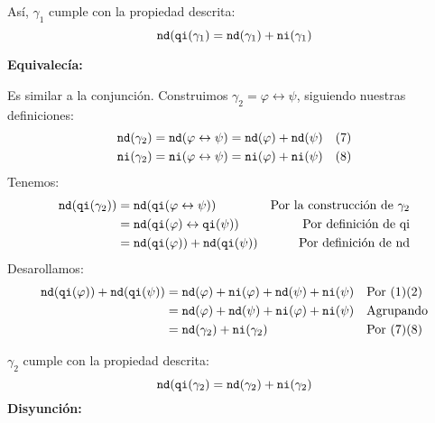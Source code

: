 \documentclass[8pt, letterpaper]{article}
\begin{document}
\begin{enumerate}
   Así, $\gamma_1$ cumple con la propiedad descrita:
   $${\tt nd}({\tt qi}(\gamma_1) = {\tt nd}(\gamma_1) + {\tt ni}(\gamma_1)$$

   \hfill\break
   {\bf Equivalecía:}

   Es similar a la conjunción. Construimos $\gamma_2 =
   \varphi \leftrightarrow\psi$, siguiendo nuestras definiciones:
   \begin{align*}
     {\tt nd}(\gamma_2) &= {\tt nd}(\varphi\leftrightarrow\psi) =
     {\tt nd}(\varphi) + {\tt nd}(\psi)& (7) \\
     {\tt ni}(\gamma_2) &= {\tt ni}(\varphi\leftrightarrow\psi) =
     {\tt ni}(\varphi) + {\tt ni}(\psi)& (8)
   \end{align*}
   Tenemos:
   \begin{align*}
     {\tt nd}({\tt qi}(\gamma_2)) &= {\tt nd}({\tt qi}(\varphi\leftrightarrow
     \psi))& \text{Por la construcción de } \gamma_2 \\
     &= {\tt nd}({\tt qi}(\varphi)\leftrightarrow{\tt qi}(\psi)) & \text{
       Por definición de qi} \\
     &= {\tt nd}({\tt qi}(\varphi)) + {\tt nd}({\tt qi}(\psi)) &
       \text{ Por definición de nd} \\
   \end{align*}
   Desarollamos:
   \begin{align*}
     {\tt nd}({\tt qi}(\varphi)) + {\tt nd}({\tt qi}(\psi)) &=
     {\tt nd}(\varphi) + {\tt ni}(\varphi)+{\tt nd}(\psi) + {\tt ni}(\psi)
     & &\text{Por } (1)(2)\\
     &= {\tt nd}(\varphi) + {\tt nd}(\psi) + {\tt ni}(\varphi) +
     {\tt ni}(\psi) & &\text{Agrupando}\\
     &=  {\tt nd}(\gamma_2) + {\tt ni}(\gamma_2)& &\text{Por } (7)(8)
     \end{align*}

   $\gamma_2$ cumple con la propiedad descrita:
   $${\tt nd}({\tt qi}(\gamma_2) = {\tt nd}(\gamma_2) + {\tt ni}(\gamma_2)$$
   \hfill\break
   {\bf Disyunción:}


\end{enumerate}
\end{document}
